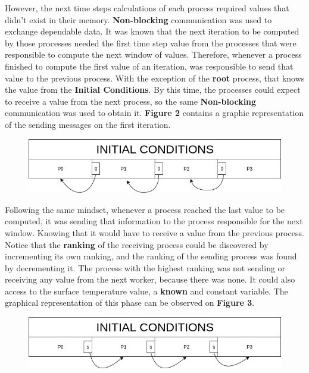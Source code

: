 \documentclass[12pt]{article}
\begin{document}
\par However, the next time steps calculations of each process required values that didn't exist in their memory. \textbf{Non-blocking} communication was used to exchange dependable data. It was known that the next iteration to be computed by those processes needed the first time step value from the processes that were responsible to compute the next window of values. Therefore, whenever a process finished to compute the first value of an iteration, was responsible to send that value to the previous process. With the exception of the \textbf{root} process, that knows the value from the \textbf{Initial Conditions}. By this time, the processes could expect to receive a value from the next process, so the same \textbf{Non-blocking} communication was used to obtain it. \textbf{Figure 2} contains a graphic representation of the sending messages on the first iteration.
\newline
\begin{figure}[!htb]
  \centering
  \includegraphics[width=.7\linewidth]{fcts_comm1.png}
\end{figure}
\hfill
\par Following the same mindset, whenever a process reached the last value to be computed, it was sending that information to the process responsible for the next window. Knowing that it would have to receive a value from the previous process. Notice that the \textbf{ranking} of the receiving process could be discovered by incrementing its own ranking, and the ranking of the sending process was found by decrementing it. The process with the highest ranking was not sending or receiving any value from the next worker, because there was none. It could also access to the surface temperature value, a \textbf{known} and constant variable. The graphical representation of this phase can be observed on \textbf{Figure 3}.
\newline
\begin{figure}[!htb]
  \centering
  \includegraphics[width=.7\linewidth]{fcts_comm2.png}
\end{figure}
\hfill
\end{document}
